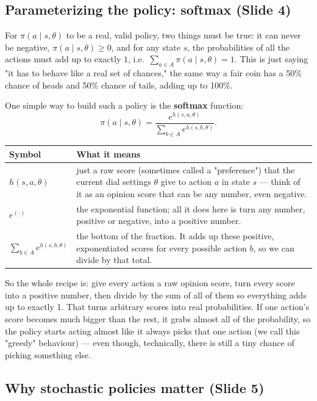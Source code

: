 \documentclass[11pt]{article}
\begin{document}
\subsection{Parameterizing the policy: softmax (Slide 4)}

For $\pi(a\mid s,\theta)$ to be a real, valid policy, two things must be true: it can never be negative, $\pi(a\mid s,\theta) \ge 0$, and for any state $s$, the probabilities of all the actions must add up to exactly $1$, i.e.\ $\sum_{a\in A}\pi(a\mid s,\theta) = 1$. This is just saying "it has to behave like a real set of chances," the same way a fair coin has a 50\% chance of heads and 50\% chance of tails, adding up to 100\%.

One simple way to build such a policy is the \textbf{softmax} function:
$$\pi(a\mid s,\theta) = \frac{e^{h(s,a,\theta)}}{\sum_{b\in A} e^{h(s,b,\theta)}}.$$
\begin{center}
\begin{tabular}{@{} >{\raggedright\arraybackslash}p{} >{\raggedright\arraybackslash}p{} @{}}
\toprule
\textbf{Symbol} & \textbf{What it means} \\
\midrule
$h(s,a,\theta)$ & just a raw score (sometimes called a "preference") that the current dial settings $\theta$ give to action $a$ in state $s$ --- think of it as an opinion score that can be any number, even negative. \\
$e^{(\cdot)}$ & the exponential function; all it does here is turn any number, positive or negative, into a positive number. \\
$\sum_{b\in A} e^{h(s,b,\theta)}$ & the bottom of the fraction. It adds up these positive, exponentiated scores for every possible action $b$, so we can divide by that total. \\
\bottomrule
\end{tabular}
\end{center}

So the whole recipe is: give every action a raw opinion score, turn every score into a positive number, then divide by the sum of all of them so everything adds up to exactly 1. That turns arbitrary scores into real probabilities. If one action's score becomes much bigger than the rest, it grabs almost all of the probability, so the policy starts acting almost like it always picks that one action (we call this "greedy" behaviour) --- even though, technically, there is still a tiny chance of picking something else.

\subsection{Why stochastic policies matter (Slide 5)}
\end{document}
